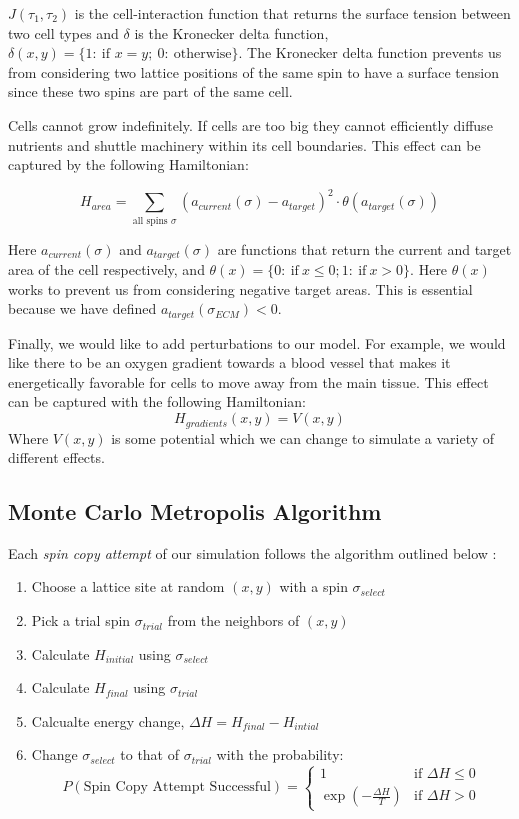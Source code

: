 \documentclass[12pt]{article}
\begin{document}
$J(\tau_1, \tau_2)$ is the cell-interaction function that returns the surface tension between two cell types and $\delta$ is the Kronecker delta function, $\delta(x,y)=\{1:~\text{if }x=y;~0:~\text{otherwise}\}$. The Kronecker delta function prevents us from considering two lattice positions of the same spin to have a surface tension since these two spins are part of the same cell.

Cells cannot grow indefinitely. If cells are too big they cannot efficiently diffuse nutrients and shuttle machinery within its cell boundaries. This effect can be captured by the following Hamiltonian:

\begin{equation}
	H_{area} = \sum_{\text{all spins }\sigma} (a_{current}(\sigma)-a_{target})^2 \cdot \theta(a_{target}(\sigma))
\end{equation}

Here $a_{current}(\sigma)$ and $a_{target}(\sigma)$ are functions that return the current and target area of the cell respectively, and $\theta(x)=\{0:~\text{if}~x\leq 0; 1:~\text{if}~x>0\}$. Here $\theta(x)$ works to prevent us from considering negative target areas. This is essential because we have defined $a_{target}(\sigma_{ECM}) < 0$.

Finally, we would like to add perturbations to our model. For example, we would like there to be an oxygen gradient towards a blood vessel that makes it energetically favorable for cells to move away from the main tissue. This effect can be captured with the following Hamiltonian:
\begin{equation}
	H_{gradients}(x,y) = V(x,y)
\end{equation}
Where $V(x,y)$ is some potential which we can change to simulate a variety of different effects.

\subsection{Monte Carlo Metropolis Algorithm}
Each \emph{spin copy attempt} of our simulation follows the algorithm outlined below \cite{Glazier2007}:

\begin{enumerate}
  \item Choose a lattice site at random $(x,y)$ with a spin $\sigma_{select}$
  \item Pick a trial spin $\sigma_{trial}$ from the neighbors of $(x,y)$
  \item Calculate $H_{initial}$ using $\sigma_{select}$
  \item Calculate $H_{final}$ using $\sigma_{trial}$
  \item Calcualte energy change, $\Delta H = H_{final} - H_{intial}$
  \item{ Change $\sigma_{select}$ to that of $\sigma_{trial}$ with the probability:
  \[
 		P(\text{Spin Copy Attempt Successful}) =
  	\begin{cases}
   		1 & \text{if } \Delta H \leq 0 \\
   		\exp{(-\frac{\Delta H}{T})}       & \text{if } \Delta H > 0
  	\end{cases}
	\]
}
\end{enumerate}
\end{document}
